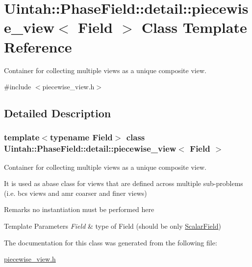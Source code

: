 \hypertarget{classUintah_1_1PhaseField_1_1detail_1_1piecewise__view}{}\section{Uintah\+:\+:Phase\+Field\+:\+:detail\+:\+:piecewise\+\_\+view$<$ Field $>$ Class Template Reference}
\label{classUintah_1_1PhaseField_1_1detail_1_1piecewise__view}


Container for collecting multiple views as a unique composite view.  




{\ttfamily \#include $<$piecewise\+\_\+view.\+h$>$}



\subsection{Detailed Description}
\subsubsection*{template$<$typename Field$>$\newline
class Uintah\+::\+Phase\+Field\+::detail\+::piecewise\+\_\+view$<$ Field $>$}

Container for collecting multiple views as a unique composite view. 

It is used as abase class for views that are defined across multiple sub-\/problems (i.\+e. bcs views and amr coarser and finer views)

\begin{DoxyRemark}{Remarks}
no instantiation must be performed here
\end{DoxyRemark}

\begin{DoxyTemplParams}{Template Parameters}
{\em Field} & type of Field (should be only \hyperlink{structUintah_1_1PhaseField_1_1ScalarField}{Scalar\+Field}) \\
\hline
\end{DoxyTemplParams}


The documentation for this class was generated from the following file\+:\begin{DoxyCompactItemize}
\item 
\hyperlink{piecewise__view_8h}{piecewise\+\_\+view.\+h}\end{DoxyCompactItemize}
